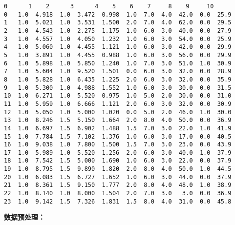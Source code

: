 \documentclass[11pt]{ctexart}
\begin{document}
    \begin{Verbatim}[commandchars=\\\{\}]
     0      1    2      3      4    5    6    7     8    9     10
0   1.0  4.918  1.0  3.472  0.998  1.0  7.0  4.0  42.0  0.0  25.9
1   1.0  5.021  1.0  3.531  1.500  2.0  7.0  4.0  62.0  0.0  29.5
2   1.0  4.543  1.0  2.275  1.175  1.0  6.0  3.0  40.0  0.0  27.9
3   1.0  4.557  1.0  4.050  1.232  1.0  6.0  3.0  54.0  0.0  25.9
4   1.0  5.060  1.0  4.455  1.121  1.0  6.0  3.0  42.0  0.0  29.9
5   1.0  3.891  1.0  4.455  0.988  1.0  6.0  3.0  56.0  0.0  29.9
6   1.0  5.898  1.0  5.850  1.240  1.0  7.0  3.0  51.0  1.0  30.9
7   1.0  5.604  1.0  9.520  1.501  0.0  6.0  3.0  32.0  0.0  28.9
8   1.0  5.828  1.0  6.435  1.225  2.0  6.0  3.0  32.0  0.0  35.9
9   1.0  5.300  1.0  4.988  1.552  1.0  6.0  3.0  30.0  0.0  31.5
10  1.0  6.271  1.0  5.520  0.975  1.0  5.0  2.0  30.0  0.0  31.0
11  1.0  5.959  1.0  6.666  1.121  2.0  6.0  3.0  32.0  0.0  30.9
12  1.0  5.050  1.0  5.000  1.020  0.0  5.0  2.0  46.0  1.0  30.0
13  1.0  8.246  1.5  5.150  1.664  2.0  8.0  4.0  50.0  0.0  36.9
14  1.0  6.697  1.5  6.902  1.488  1.5  7.0  3.0  22.0  1.0  41.9
15  1.0  7.784  1.5  7.102  1.376  1.0  6.0  3.0  17.0  0.0  40.5
16  1.0  9.038  1.0  7.800  1.500  1.5  7.0  3.0  23.0  0.0  43.9
17  1.0  5.989  1.0  5.520  1.256  2.0  6.0  3.0  40.0  1.0  37.9
18  1.0  7.542  1.5  5.000  1.690  1.0  6.0  3.0  22.0  0.0  37.9
19  1.0  8.795  1.5  9.890  1.820  2.0  8.0  4.0  50.0  1.0  44.5
20  1.0  6.083  1.5  6.727  1.652  1.0  6.0  3.0  44.0  0.0  37.9
21  1.0  8.361  1.5  9.150  1.777  2.0  8.0  4.0  48.0  1.0  38.9
22  1.0  8.140  1.0  8.000  1.504  2.0  7.0  3.0   3.0  0.0  36.9
23  1.0  9.142  1.5  7.326  1.831  1.5  8.0  4.0  31.0  0.0  45.8
    \end{Verbatim}

    \textbf{数据预处理：}
\end{document}
